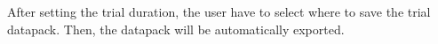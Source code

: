 After setting the trial duration, the user have to select where to save the trial datapack. Then, the datapack will be automatically exported.\\




